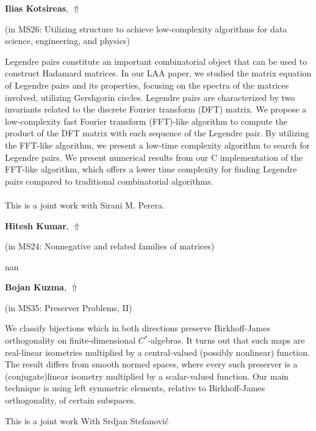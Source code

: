 \documentclass[ILAS2025-program.tex]{subfiles}
\begin{document}
     \hypertarget{down0135}{}\begin{ilasabstract}
    
    \textbf{Ilias Kotsireas},  \hfill \hyperlink{up0135}{$\Uparrow$}
    
    (in {\color{mstitle}MS26: Utilizing structure to achieve low-complexity algorithms for data science, engineering, and physics})
        
        \mtskip
    Legendre pairs constitute an important combinatorial object that can be used to construct Hadamard matrices. 
In our LAA paper, we studied the matrix equation of Legendre pairs and its properties, focusing on the spectra of the matrices involved, utilizing Gershgorin circles. Legendre pairs are characterized by two invariants related to the discrete Fourier transform (DFT) matrix. We propose a low-complexity fast Fourier transform (FFT)-like algorithm to compute the product of the DFT matrix with each sequence of the Legendre pair. By utilizing the FFT-like algorithm, we present a low-time complexity algorithm to search for Legendre pairs. We present numerical results from our C implementation of the FFT-like algorithm, which offers a lower time complexity for finding Legendre pairs compared to traditional combinatorial algorithms. 
\\\\
This is a joint work with Sirani M. Perera.
\end{ilasabstract}
     \hypertarget{down0352}{}\begin{ilasabstract}
    
    \textbf{Hitesh Kumar},  \hfill \hyperlink{up0352}{$\Uparrow$}
    
    (in {\color{mstitle}MS24: Nonnegative and related families of matrices})
        
        \mtskip
    nan\end{ilasabstract}
     \hypertarget{down0247}{}\begin{ilasabstract}
    
    \textbf{Bojan Kuzma},  \hfill \hyperlink{up0247}{$\Uparrow$}
    
    (in {\color{mstitle}MS35: Preserver Problems, II})
        
        \mtskip
    We classify bijections which in both directions preserve Birkhoff-James orthogonality on finite-dimensional $C^*$-algebras. It turns out that such maps are  real-linear isometries  multiplied by a  central-valued (possibly nonlinear) function. The result differs from smooth normed spaces, where every such preserver is a (conjugate)linear isometry multiplied by a  scalar-valued function.
Our main technique  is using left symmetric elements, relative to Birkhoff-James orthogonality, of certain subspaces. 

This is a joint work With Srdjan Stefanovi\'c
\end{ilasabstract}
\end{document}
